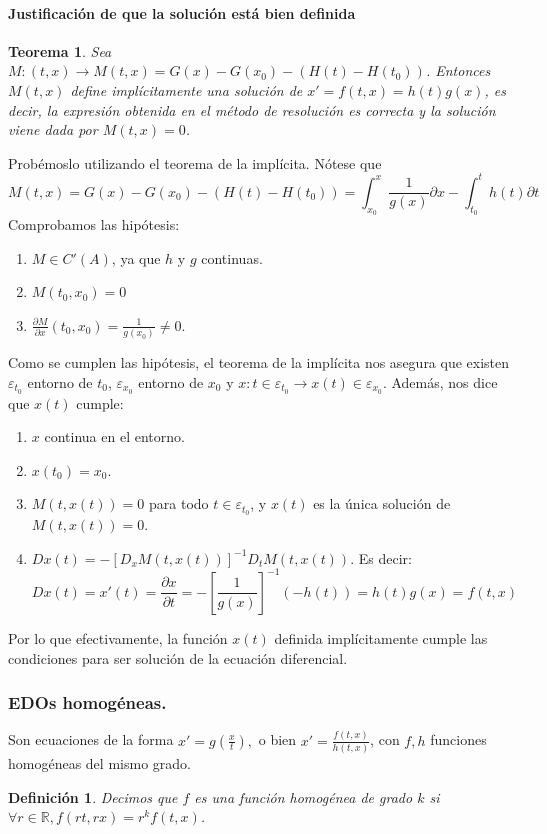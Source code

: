 \documentclass[11pt, a4paper,twoside]{article}
\makeatletter
\newcommand{\iindex}[1]{\emph{#1}\index{#1}}
\theoremstyle{theorem-style}  %
\newtheorem{theorem}{Teorema}[section]  %
\renewenvironment{proof}[1][\proofname]{\par
	\pushQED{\qed}%
	\normalfont \topsep6\p@\@plus6\p@\relax
	\list{}{%
		\settowidth{\leftmargin}{\quad:\hskip\labelsep}%
		\setlength{\labelwidth}{0pt}%
		\setlength{\itemindent}{-\leftmargin}%
	}%
	\item[\hskip\labelsep\itshape#1\@addpunct{:}]\ignorespaces
}{%
	\popQED\endlist\@endpefalse
}
\theoremstyle{definition-style}
\newtheorem{definition}{Definición}[section]
\theoremstyle{example-style}
\makeatother
\begin{document}
\paragraph{Justificación de que la solución está bien definida}
\begin{theorem}
	Sea $ M:(t,x)\longrightarrow M(t,x)=G(x)-G(x_0)-(H(t)-H(t_0)) $. Entonces $ M(t,x) $ define implícitamente una solución de $ x'=f(t,x)=h(t)g(x) $, es decir, la expresión obtenida en el método de resolución es correcta y la solución viene dada por $ M(t,x)=0 $.
\end{theorem}
\begin{proof}
	Probémoslo utilizando el teorema de la implícita. Nótese que 
	\[  M(t,x)=G(x)-G(x_0)-(H(t)-H(t_0))= \int_{x_0}^{x} \frac{1}{g(x)} \partial x- \int_{t_0}^{t} h(t) \partial t \]
	Comprobamos las hipótesis:
	\begin{enumerate}
		\item $ M\in C'(A) $, ya que $ h $ y $ g $ continuas.
		\item $ M(t_0,x_0)=0 $
		\item $ \frac{\partial M}{\partial x}(t_0,x_0)=\frac{1}{g(x_0)}\neq 0 $.
	\end{enumerate}
	Como se cumplen las hipótesis, el teorema de la implícita nos asegura que existen $ \varepsilon_{t_0} $ entorno de $ t_0 $, $ \varepsilon_{x_0} $ entorno de $ x_0 $ y $ x:t\in\varepsilon_{t_0}\longrightarrow x(t)\in\varepsilon_{x_0}$. Además, nos dice que $ x(t) $ cumple:
	\begin{enumerate}
		\item $ x $ continua en el entorno.
		\item $ x(t_0)=x_0 $.
		\item $ M(t,x(t))=0 $ para todo $ t\in \varepsilon_{t_0} $, y $ x(t) $ es la única solución de $ M(t,x(t))=0 $.
		\item $ D x(t)=-[D_x M(t,x(t))]^{-1}D_tM(t,x(t)) $. Es decir:
		\[ Dx(t)=x'(t)=\frac{\partial x}{\partial t}= -[\frac{1}{g(x)}]^{-1}(-h(t))=h(t)g(x)=f(t,x) \]
	\end{enumerate}
	Por lo que efectivamente, la función $ x(t) $ definida implícitamente cumple las condiciones para ser solución de la ecuación diferencial.
\end{proof}
\subsubsection{EDOs homogéneas.}
Son ecuaciones de la forma $ x'=g(\frac{x}{t}), $ o bien $ x'=\frac{f(t,x)}{h(t,x)} $, con $ f,h $ funciones homogéneas del mismo grado.
\begin{definition}
	Decimos que $ f $ es una \iindex{función homogénea de grado $ k $} si $ \forall r \in \mathbb{R}, f(rt,rx)=r^kf(t,x)$.
\end{definition}
\end{document}
